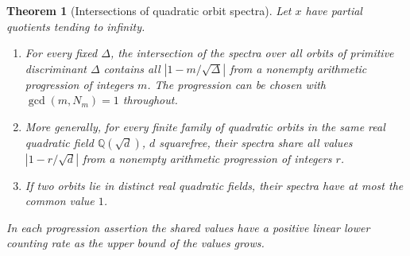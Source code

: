\documentclass[11pt]{amsart}
\newtheorem{theorem}{Theorem}[section]
\theoremstyle{definition}
\theoremstyle{remark}
\numberwithin{equation}{section}
\newcommand{\Q}{\mathbb{Q}}
\begin{document}
\begin{theorem}[Intersections of quadratic orbit spectra]
\label{thm:trace-common-progression}
Let $x$ have partial quotients tending to infinity.
\begin{enumerate}
\item For every fixed $\Delta$, the intersection of the spectra over
all orbits of primitive discriminant $\Delta$ contains all
$|1-m/\sqrt\Delta|$ from a nonempty arithmetic progression
of integers $m$. The progression can be chosen with
$\gcd(m,N_m)=1$ throughout.
\item More generally, for every finite family of quadratic orbits
in the same real quadratic field $\Q(\sqrt d)$, $d$ squarefree,
their spectra share all values $|1-r/\sqrt d|$ from a nonempty
arithmetic progression of integers $r$.
\item If two orbits lie in distinct real quadratic fields, their
spectra have at most the common value $1$.
\end{enumerate}
In each progression assertion the shared values have a positive
linear lower counting rate as the upper bound of the values grows.
\end{theorem}
\end{document}
